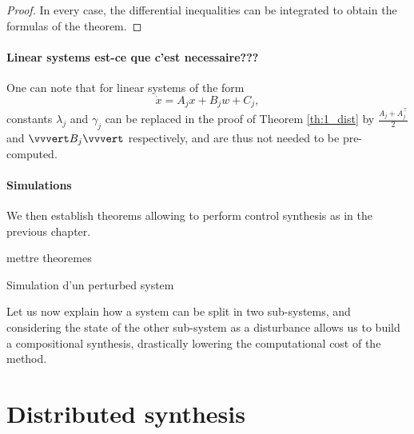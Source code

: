 \begin{proof}
In every case, the differential inequalities can be integrated to
obtain the formulas of the theorem.

 \end{proof}
%

\paragraph{Linear systems {\todo est-ce que c'est necessaire???}}

One can note that for linear systems of the form
$$ \dot x = A_j x + B_j w + C_j, $$
constants $\lambda_j$ and $\gamma_j$ can be replaced in the 
proof of Theorem \ref{th:1_dist} by
$ \frac{A_j + A_j^\top}{2}$ and $\vvvert B_j \vvvert$ respectively, 
and are thus not needed to be pre-computed.


\paragraph{Simulations}

We then establish theorems allowing to perform control synthesis as in the previous chapter.

{\todo mettre theoremes}

{\todo Simulation d'un perturbed system}

Let us now explain how a system can be split in two sub-systems, and 
considering the state of the other sub-system as a disturbance 
allows us to build a compositional synthesis, drastically lowering the computational
cost of the method. 



\section{Distributed synthesis}\label{sec:distributed}

